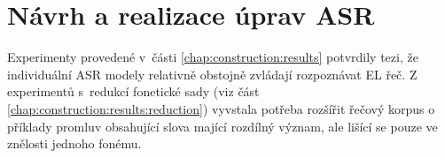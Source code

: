 \ifdefined\CELE
\else

\fi

\chapter{Návrh a realizace úprav ASR}
\label{chap:realisation}

Experimenty provedené v~části \ref{chap:construction:results} potvrdily tezi, že individuální ASR modely relativně obstojně zvládají rozpoznávat EL řeč.
Z experimentů s~redukcí fonetické sady (viz část \ref{chap:construction:results:reduction}) vyvstala potřeba rozšířit řečový korpus o příklady promluv obsahující slova mající rozdílný význam, ale lišící se pouze ve znělosti jednoho fonému.











\ifdefined\CELE
\else

\fi
